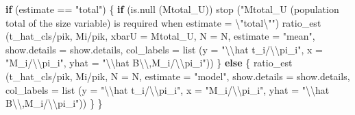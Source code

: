 \documentclass[
  letterpaper,
  DIV=11,
  numbers=noendperiod]{scrreprt}
\newenvironment{Shaded}{\begin{snugshade}}{\end{snugshade}}
\newcommand{\AttributeTok}[1]{\textcolor[rgb]{0.40,0.45,0.13}{#1}}
\newcommand{\ControlFlowTok}[1]{\textcolor[rgb]{0.00,0.23,0.31}{\textbf{#1}}}
\newcommand{\FunctionTok}[1]{\textcolor[rgb]{0.28,0.35,0.67}{#1}}
\newcommand{\NormalTok}[1]{\textcolor[rgb]{0.00,0.23,0.31}{#1}}
\newcommand{\SpecialCharTok}[1]{\textcolor[rgb]{0.37,0.37,0.37}{#1}}
\newcommand{\StringTok}[1]{\textcolor[rgb]{0.13,0.47,0.30}{#1}}
\renewcommand{\[}{\begin{equation}}
\renewcommand{\]}{\end{equation}}
\begin{document}
\begin{Shaded}
\begin{Highlighting}[]
  \ControlFlowTok{if}\NormalTok{ (estimate }\SpecialCharTok{==} \StringTok{"total"}\NormalTok{)}
\NormalTok{  \{}
      \ControlFlowTok{if}\NormalTok{ (}\FunctionTok{is.null}\NormalTok{ (Mtotal\_U))}
          \FunctionTok{stop}\NormalTok{ (}\StringTok{"Mtotal\_U (population total of the size variable) is required when estimate = }\SpecialCharTok{\textbackslash{}"}\StringTok{total}\SpecialCharTok{\textbackslash{}"}\StringTok{"}\NormalTok{)}
      \FunctionTok{ratio\_est}\NormalTok{ (t\_hat\_cls}\SpecialCharTok{/}\NormalTok{pik, Mi}\SpecialCharTok{/}\NormalTok{pik, }\AttributeTok{xbarU =}\NormalTok{ Mtotal\_U, }\AttributeTok{N =}\NormalTok{ N, }\AttributeTok{estimate =} \StringTok{"mean"}\NormalTok{, }\AttributeTok{show.details =}\NormalTok{ show.details,}
                 \AttributeTok{col\_labels =} \FunctionTok{list}\NormalTok{ (}\AttributeTok{y =} \StringTok{"}\SpecialCharTok{\textbackslash{}\textbackslash{}}\StringTok{hat t\_i/}\SpecialCharTok{\textbackslash{}\textbackslash{}}\StringTok{pi\_i"}\NormalTok{, }\AttributeTok{x =} \StringTok{"M\_i/}\SpecialCharTok{\textbackslash{}\textbackslash{}}\StringTok{pi\_i"}\NormalTok{, }\AttributeTok{yhat =} \StringTok{"}\SpecialCharTok{\textbackslash{}\textbackslash{}}\StringTok{hat B}\SpecialCharTok{\textbackslash{}\textbackslash{}}\StringTok{,M\_i/}\SpecialCharTok{\textbackslash{}\textbackslash{}}\StringTok{pi\_i"}\NormalTok{))}
\NormalTok{  \}}
  \ControlFlowTok{else}
\NormalTok{  \{}
      \FunctionTok{ratio\_est}\NormalTok{ (t\_hat\_cls}\SpecialCharTok{/}\NormalTok{pik, Mi}\SpecialCharTok{/}\NormalTok{pik, }\AttributeTok{N =}\NormalTok{ N, }\AttributeTok{estimate =} \StringTok{"model"}\NormalTok{, }\AttributeTok{show.details =}\NormalTok{ show.details,}
                 \AttributeTok{col\_labels =} \FunctionTok{list}\NormalTok{ (}\AttributeTok{y =} \StringTok{"}\SpecialCharTok{\textbackslash{}\textbackslash{}}\StringTok{hat t\_i/}\SpecialCharTok{\textbackslash{}\textbackslash{}}\StringTok{pi\_i"}\NormalTok{, }\AttributeTok{x =} \StringTok{"M\_i/}\SpecialCharTok{\textbackslash{}\textbackslash{}}\StringTok{pi\_i"}\NormalTok{, }\AttributeTok{yhat =} \StringTok{"}\SpecialCharTok{\textbackslash{}\textbackslash{}}\StringTok{hat B}\SpecialCharTok{\textbackslash{}\textbackslash{}}\StringTok{,M\_i/}\SpecialCharTok{\textbackslash{}\textbackslash{}}\StringTok{pi\_i"}\NormalTok{))}
\NormalTok{  \}}
\NormalTok{\}}
\end{Highlighting}
\end{Shaded}
\end{document}
